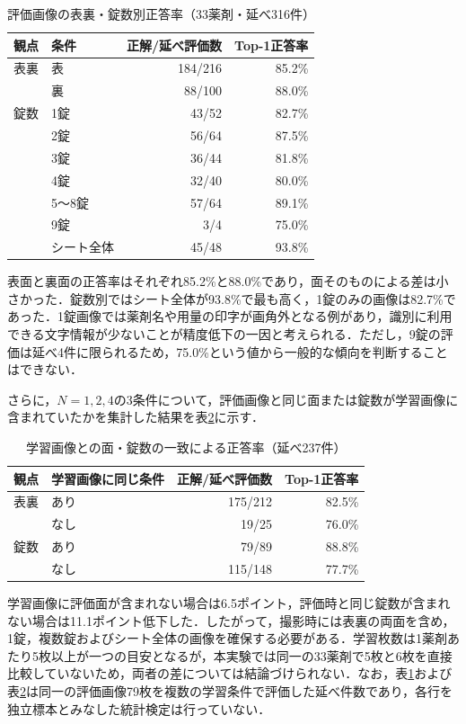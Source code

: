 \documentclass[dvipdfmx]{jsarticle}
\begin{document}
\begin{table}[htbp]
\centering
\caption{評価画像の表裏・錠数別正答率（33薬剤・延べ316件）}
\label{tab:fewshot_face_count}
\begin{tabular}{llrr}
\hline
観点 & 条件 & 正解/延べ評価数 & Top-1正答率 \\
\hline
表裏 & 表 & 184/216 & 85.2\% \\
     & 裏 & 88/100 & 88.0\% \\
\hline
錠数 & 1錠 & 43/52 & 82.7\% \\
     & 2錠 & 56/64 & 87.5\% \\
     & 3錠 & 36/44 & 81.8\% \\
     & 4錠 & 32/40 & 80.0\% \\
     & 5〜8錠 & 57/64 & 89.1\% \\
     & 9錠 & 3/4 & 75.0\% \\
     & シート全体 & 45/48 & 93.8\% \\
\hline
\end{tabular}
\end{table}

表面と裏面の正答率はそれぞれ85.2\%と88.0\%であり，面そのものによる差は小さかった．錠数別ではシート全体が93.8\%で最も高く，1錠のみの画像は82.7\%であった．1錠画像では薬剤名や用量の印字が画角外となる例があり，識別に利用できる文字情報が少ないことが精度低下の一因と考えられる．ただし，9錠の評価は延べ4件に限られるため，75.0\%という値から一般的な傾向を判断することはできない．

さらに，$N=1,2,4$の3条件について，評価画像と同じ面または錠数が学習画像に含まれていたかを集計した結果を表\ref{tab:fewshot_match}に示す．

\begin{table}[htbp]
\centering
\caption{学習画像との面・錠数の一致による正答率（延べ237件）}
\label{tab:fewshot_match}
\begin{tabular}{llrr}
\hline
観点 & 学習画像に同じ条件 & 正解/延べ評価数 & Top-1正答率 \\
\hline
表裏 & あり & 175/212 & 82.5\% \\
     & なし & 19/25 & 76.0\% \\
錠数 & あり & 79/89 & 88.8\% \\
     & なし & 115/148 & 77.7\% \\
\hline
\end{tabular}
\end{table}

学習画像に評価面が含まれない場合は6.5ポイント，評価時と同じ錠数が含まれない場合は11.1ポイント低下した．したがって，撮影時には表裏の両面を含め，1錠，複数錠およびシート全体の画像を確保する必要がある．学習枚数は1薬剤あたり5枚以上が一つの目安となるが，本実験では同一の33薬剤で5枚と6枚を直接比較していないため，両者の差については結論づけられない．なお，表\ref{tab:fewshot_face_count}および表\ref{tab:fewshot_match}は同一の評価画像79枚を複数の学習条件で評価した延べ件数であり，各行を独立標本とみなした統計検定は行っていない．
\end{document}

